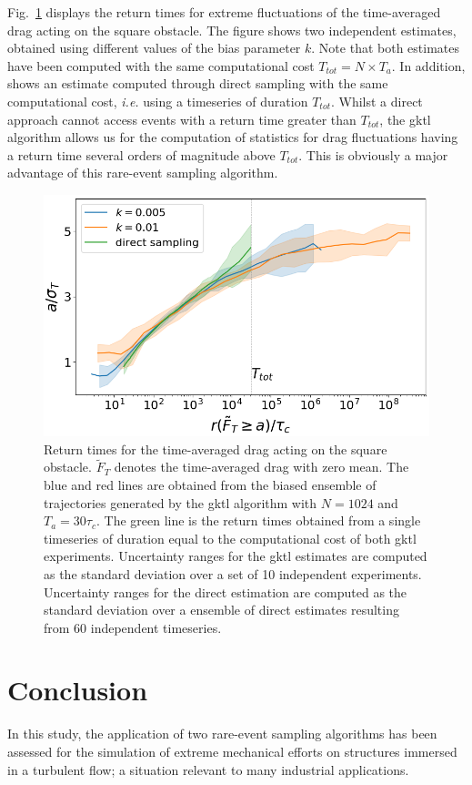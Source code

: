\documentclass{jfm}
\newcommand{\EL}[1]{{\color{myred}{#1}}}
\begin{document}
Fig.~\ref{fig:return_times_gktl} displays the return times for extreme fluctuations of the time-averaged drag acting on the square obstacle.
The figure shows two independent estimates, obtained using different values of the bias parameter $k$.
Note that both estimates have been computed with the same computational cost $T_{tot}=N\times T_a$.
In addition, \EL{Fig.~\ref{fig:return_times_gktl}} shows an estimate computed through direct sampling with the same computational cost, \textit{i.e.} using a timeseries of duration $T_{tot}$.
Whilst a direct approach cannot access events with a return time greater than $T_{tot}$, the \ac{gktl} algorithm allows us for the computation of statistics for drag fluctuations having a return time several orders of magnitude above $T_{tot}$. This is  obviously a major advantage of this rare-event sampling algorithm.

\begin{figure}
  \centering
  \includegraphics[width=.7\linewidth]{return_times_GKTL/return_times_GKTL}
  \caption{\label{fig:return_times_gktl} Return times for the time-averaged drag acting on the square obstacle. $\tilde{F}_T$ denotes the time-averaged drag with zero mean. The blue and red lines are obtained from the biased ensemble of trajectories generated by the \ac{gktl} algorithm with $N=1024$ and $T_a=30\tau_c$. The green line is the return times obtained from a single timeseries of duration equal to the computational cost of both \ac{gktl} experiments. Uncertainty ranges for the \ac{gktl} estimates are computed as the standard deviation over a set of 10 independent experiments. Uncertainty ranges for the direct estimation are computed as the standard deviation over a ensemble of direct estimates resulting from 60 independent timeseries.}
\end{figure}

\section{Conclusion}
\label{conlusion}
In this study, the application of two rare-event sampling algorithms has been assessed for the simulation of extreme mechanical efforts on structures immersed in a turbulent flow; a situation relevant to many industrial applications.
\end{document}
